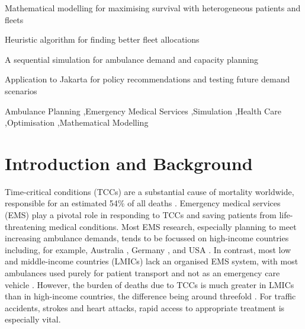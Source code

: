 \documentclass[preprint,12pt]{elsarticle}
\begin{document}
\begin{frontmatter}
\begin{abstract}
\end{abstract}


\begin{highlights}
\item Mathematical modelling for maximising survival with heterogeneous patients and fleets
\item Heuristic algorithm for finding better fleet allocations
\item A sequential simulation for ambulance demand and capacity planning
\item Application to Jakarta for policy recommendations and testing future demand scenarios
\end{highlights}

\begin{keyword}
Ambulance Planning \sep Emergency Medical Services \sep Simulation \sep Health Care \sep Optimisation \sep Mathematical Modelling
\end{keyword}

\end{frontmatter}


\newpage


\section{Introduction and Background}
Time-critical conditions (TCCs) are a substantial cause of mortality worldwide, responsible for an estimated 54\% of all deaths \cite{FraserBMJ}. Emergency medical services (EMS) play a pivotal role in responding to TCCs and saving patients from life-threatening medical conditions. Most EMS research, especially  planning to meet increasing ambulance demands, tends to be focussed on high-income countries including, for example, Australia \cite{lowthian2011increasing}, Germany \cite{veser2015demographic}, and USA \cite{birmingham2021trends}. In contrast, most low and middle-income countries (LMICs) lack an organised EMS system, with most ambulances used purely for patient transport and not as an emergency care vehicle \cite{plummer2017ems}.  However, the burden of deaths due to TCCs is much greater in LMICs than in high-income countries, the difference being around threefold \cite{ChangPMC}. For traffic accidents, strokes and heart attacks, rapid access to appropriate treatment is especially vital. 
\end{document}
